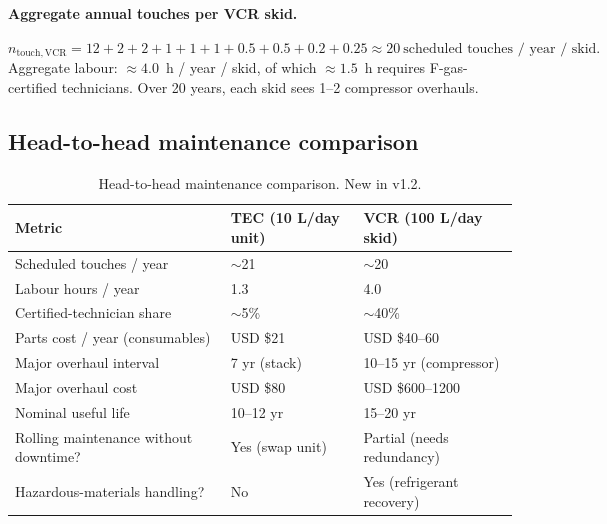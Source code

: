 \documentclass[11pt,a4paper]{article}
\begin{document}
\paragraph{Aggregate annual touches per VCR skid.}
\begin{equation}
n_{\mathrm{touch,VCR}} = 12 + 2 + 2 + 1 + 1 + 1 + 0.5 + 0.5 + 0.2 + 0.25 \approx 20\ \text{scheduled touches / year / skid.}
\end{equation}
Aggregate labour: $\approx 4.0$~h / year / skid, of which $\approx 1.5$~h requires F-gas-certified technicians. Over 20 years, each skid sees 1--2 compressor overhauls.

\subsection{Head-to-head maintenance comparison}
\begin{table}[h]
\centering\small
\caption{Head-to-head maintenance comparison. New in v1.2.}
\label{tab:maint_compare}
\begin{tabular}{@{}lll@{}}
\toprule
\textbf{Metric} & \textbf{TEC (10 L/day unit)} & \textbf{VCR (100 L/day skid)}\\
\midrule
Scheduled touches / year                 & $\sim$21      & $\sim$20 \\
Labour hours / year                      & 1.3          & 4.0 \\
Certified-technician share               & $\sim$5\%    & $\sim$40\% \\
Parts cost / year (consumables)          & USD \$21     & USD \$40--60 \\
Major overhaul interval                  & 7 yr (stack) & 10--15 yr (compressor) \\
Major overhaul cost                      & USD \$80     & USD \$600--1200 \\
Nominal useful life                      & 10--12 yr    & 15--20 yr \\
Rolling maintenance without downtime?    & Yes (swap unit) & Partial (needs redundancy) \\
Hazardous-materials handling?            & No            & Yes (refrigerant recovery) \\
\bottomrule
\end{tabular}
\end{table}
\end{document}
